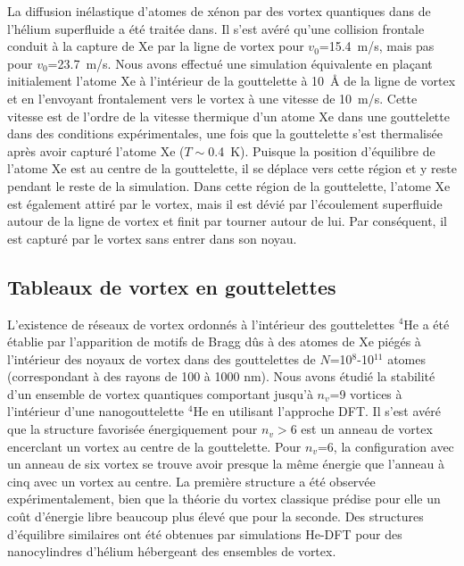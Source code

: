 La diffusion inélastique d'atomes de xénon par des vortex quantiques dans de l'hélium superfluide a été traitée dans.
 Il s'est avéré qu'une collision frontale conduit à la capture de Xe par la ligne de vortex pour $v_0$=15.4~m/s, mais pas pour $v_0$=23.7~m/s.
Nous avons effectué une simulation équivalente en plaçant initialement l'atome Xe à l'intérieur de la gouttelette à 10~\AA{} de la ligne de vortex et en l'envoyant frontalement vers le vortex à une vitesse de 10~m/s.
Cette vitesse est de l'ordre de la vitesse thermique d'un atome Xe dans une gouttelette dans des conditions expérimentales, une fois que la gouttelette s'est thermalisée après avoir capturé l'atome Xe ($T\!\!\sim$0.4~K)\citep{Toe04}.
Puisque la position d'équilibre de l'atome Xe est au centre de la gouttelette, il se déplace vers cette région et y reste pendant le reste de la simulation.
Dans cette région de la gouttelette, l'atome Xe est également attiré par le vortex, mais il est dévié par l'écoulement superfluide autour de la ligne de vortex et finit par tourner autour de lui.
 Par conséquent, il est capturé par le vortex sans entrer dans son noyau.
 
 	\subsection*{Tableaux de vortex en gouttelettes}
   L'existence de réseaux de vortex ordonnés à l'intérieur des gouttelettes $^4$He a été établie par l'apparition de motifs de Bragg dûs à des atomes de  Xe piégés à l'intérieur des noyaux de vortex dans des gouttelettes de $N$=10$^8$-10$^{11}$ atomes (correspondant à des rayons de 100 à 1000 nm)\citep{Gom14,Jones2016}. 
   Nous avons étudié la stabilité d'un ensemble de vortex quantiques comportant  jusqu'à $n_v$=9 vortices à l'intérieur d'une nanogouttelette $^4$He en utilisant l'approche DFT\citep{Anc15}.
   Il s'est avéré que la structure favorisée énergiquement pour $n_v\!\!>$6 est un anneau
de vortex encerclant un vortex au centre de la gouttelette.
   Pour $n_v$=6, la configuration avec un anneau de six vortex se trouve avoir presque
la même énergie que l'anneau à cinq avec un vortex au centre. 
   La première structure a été observée expérimentalement\citep{Gom14,Jones2016,Ber17},
bien que la théorie du vortex classique prédise pour elle un coût d'énergie libre beaucoup plus élevé que pour la seconde\citep{Cam79}.
   Des structures d'équilibre similaires ont été obtenues par simulations He-DFT pour des nanocylindres d'hélium hébergeant des ensembles de vortex\citep{Anc14}.

